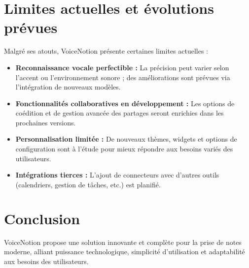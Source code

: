 \section{Limites actuelles et évolutions prévues}
Malgré ses atouts, VoiceNotion présente certaines limites actuelles :
\begin{itemize}
    \item \textbf{Reconnaissance vocale perfectible :} La précision peut varier selon l’accent ou l’environnement sonore ; des améliorations sont prévues via l’intégration de nouveaux modèles.
    \item \textbf{Fonctionnalités collaboratives en développement :} Les options de coédition et de gestion avancée des partages seront enrichies dans les prochaines versions.
    \item \textbf{Personnalisation limitée :} De nouveaux thèmes, widgets et options de configuration sont à l’étude pour mieux répondre aux besoins variés des utilisateurs.
    \item \textbf{Intégrations tierces :} L’ajout de connecteurs avec d’autres outils (calendriers, gestion de tâches, etc.) est planifié.
\end{itemize}

\section*{Conclusion}
VoiceNotion propose une solution innovante et complète pour la prise de notes moderne, alliant puissance technologique, simplicité d’utilisation et adaptabilité aux besoins des utilisateurs.
